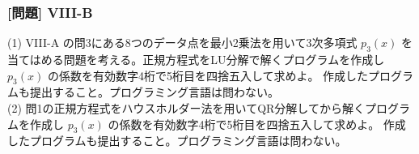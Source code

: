\documentclass[dvipdfmx,aspectratio=169,20pt]{beamer}
\newcommand{\myfontsetting}[3]{{\fontsize{#1}{#2}\selectfont #3}}
\begin{document}
\begin{frame}
\frametitle{[問題] V\hspace{-.1em}I\hspace{-.1em}I\hspace{-.1em}I-B}
\myfontsetting{15pt}{20pt}{
(1) {V\hspace{-.1em}I\hspace{-.1em}I\hspace{-.1em}I-A} の問3にある8つのデータ点を最小2乗法を用いて3次多項式 $p_3(x)$ を当てはめる問題を考える。正規方程式をLU分解で解くプログラムを作成し $p_3(x)$ の係数を有効数字4桁で5桁目を四捨五入して求めよ。
作成したプログラムも提出すること。プログラミング言語は問わない。\\
(2) 問1の正規方程式をハウスホルダー法を用いてQR分解してから解くプログラムを作成し $p_3(x)$ の係数を有効数字4桁で5桁目を四捨五入して求めよ。
作成したプログラムも提出すること。プログラミング言語は問わない。
}
\end{frame}
\end{document}
